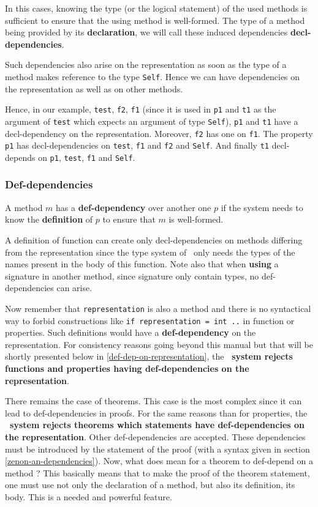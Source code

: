 In this cases, knowing the type (or the logical statement) of the used
methods is sufficient to ensure that the using method is
well-formed. The type of a method being provided by its
{\bf declaration}, we will call these induced dependencies
{\bf decl-dependencies}.

Such dependencies also arise on the representation as soon as the type
of a method makes reference to the type {\tt Self}. Hence we can have
dependencies on the representation as well as on other methods.

Hence, in our example, {\tt test}, {\tt f2}, {\tt f1} (since it is
used in {\tt p1} and {\tt t1} as the argument of {\tt test} which expects
an argument of type {\tt Self}), {\tt p1} and {\tt t1} have a
decl-dependency on the representation. Moreover, {\tt f2} has one on
{\tt f1}. The property {\tt p1} has decl-dependencies on {\tt test},
{\tt f1} and {\tt f2} and {\tt Self}. And finally {\tt t1}
decl-depends on {\tt p1}, {\tt test}, {\tt f1} and {\tt Self}.



\subsubsection{Def-dependencies}
\label{def-dependency}
A method $m$ has a 
{\bf def-dependency} over another one $p$ if the system needs to
know the {\bf definition} of $p$   to ensure that $m$ is well-formed.

A definition of function can create  only decl-dependencies on
methods differing from the representation since the type system of
\focal\ only needs the types of the names present in the body of this
function. Note also that when {\bf using} a signature in another
method, since signature only contain types, no def-dependencies can
arise.

Now remember that {\tt representation} is also a method and there is
no syntactical way to forbid constructions like {\tt if representation
  = int ..} in function or properties. Such definitions would have a
{\bf def-dependency} on the representation.  For consistency reasons going beyond this manual
but that will be shortly presented below in
\ref{def-dep-on-representation}, the {\bf \focal\ system rejects
  functions and properties having def-dependencies on the
  representation}.

\smallskip There remains the case of theorems. This case is the most
complex since it can lead to def-dependencies in proofs.  For the same
reasons than for properties, the {\bf \focal\ system rejects theorems
  which statements have def-dependencies on the representation}. Other
def-dependencies are accepted.  These dependencies must be introduced
by the statement of the proof (with a syntax given in section
\ref{zenon-an-dependencies}).  Now, what does mean for a theorem to
def-depend on a method ? This basically means that to make the proof
of the theorem statement, one must use not only the declaration of a
method, but also its definition, its body. This is a needed and powerful feature.



